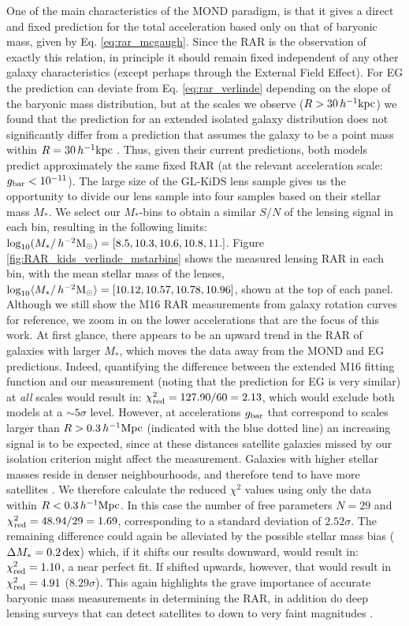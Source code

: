 \documentclass[usenatbib]{mnras}
\newcommand{\hmsun}{\,h^{-2} {\rm M_\odot}}
\newcommand{\hkpc}{\, h^{-1}{\rm{kpc}} }
\newcommand{\hMpc}{\, h^{-1}{\rm{Mpc}} }
\newcommand{\lan}{\langle}
\newcommand{\ran}{\rangle}
\newcommand{\un}[1]{_{\rm #1}}
\newcommand{\dex}{\, {\rm dex}}
\begin{document}
One of the main characteristics of the MOND paradigm, is that it gives a direct and fixed prediction for the total acceleration based only on that of baryonic mass, given by Eq. \ref{eq:rar_mcgaugh}. Since the RAR is the observation of exactly this relation, in principle it should remain fixed independent of any other galaxy characteristics (except perhaps through the External Field Effect). For EG the prediction can deviate from Eq. \ref{eq:rar_verlinde} depending on the slope of the baryonic mass distribution, but at the scales we observe ($R>30\hkpc$) we found that the prediction for an extended isolated galaxy distribution does not significantly differ from a prediction that assumes the galaxy to be a point mass within $R=30\hkpc$ \cite[see Sect. 4.3 of][]{brouwer2017}. Thus, given their current predictions, both models predict approximately the same fixed RAR (at the relevant acceleration scale: $g\un{bar}<10^{-11}$). The large size of the GL-KiDS lens sample gives us the opportunity to divide our lens sample into four samples based on their stellar mass $M_*$. We select our $M_*$-bins to obtain a similar $S/N$ of the lensing signal in each bin, resulting in the following limits: $\log_{10}(M_*/\hmsun) = [8.5,10.3,10.6,10.8,11.]$. Figure \ref{fig:RAR_kids_verlinde_mstarbins} shows the measured lensing RAR in each bin, with the mean stellar mass of the lenses, $\log_{10}\lan M_*/\hmsun \ran = [10.12, 10.57, 10.78, 10.96]$, shown at the top of each panel. Although we still show the M16 RAR measurements from galaxy rotation curves for reference, we zoom in on the lower accelerations that are the focus of this work. At first glance, there appears to be an upward trend in the RAR of galaxies with larger $M_*$, which moves the data away from the MOND and EG predictions. Indeed, quantifying the difference between the extended M16 fitting function and our measurement (noting that the prediction for EG is very similar) at \emph{all} scales would result in: $\chi\un{red}^2 = 127.90 / 60 = 2.13$, which would exclude both models at a $\sim5 \sigma$ level. However, at accelerations $g\un{bar}$ that correspond to scales larger than $R > 0.3 \hMpc$ (indicated with the blue dotted line) an increasing signal is to be expected, since at these distances satellite galaxies missed by our isolation criterion might affect the measurement. Galaxies with higher stellar masses reside in denser neighbourhoods, and therefore tend to have more satellites \cite[see e.g.]{baldry2006, bolzonella2010, brouwer2016}. We therefore calculate the reduced $\chi^2$ values using only the data within $R < 0.3 \hMpc$. In this case the number of free parameters $N = 29$ and $\chi\un{red}^2 = 48.94/29 = 1.69$, corresponding to a standard deviation of $2.52\sigma$. The remaining difference could again be alleviated by the possible stellar mass bias ($\Delta M_* = 0.2 \dex$) which, if it shifts our results downward, would result in: $\chi\un{red}^2 = 1.10$, a near perfect fit. If shifted upwards, however, that would result in $\chi\un{red}^2=4.91$ ($8.29 \sigma$). This again highlights the grave importance of accurate baryonic mass measurements in determining the RAR, in addition do deep lensing surveys that can detect satellites to down to very faint magnitudes \cite[such as the future Euclid survey;][]{laureijs2011}.
\end{document}

